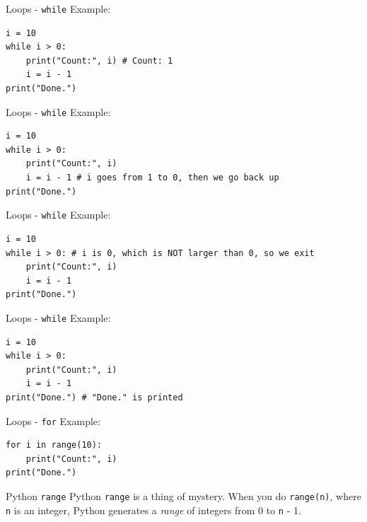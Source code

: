 \documentclass[dvipsnames, svgnames, x11names, handout]{beamer}
\begin{document}
\addtocounter{framenumber}{-1}

\begin{frame}[fragile]{Loops - \texttt{while}}
Example:
\begin{verbatim}
i = 10
while i > 0: 
    print("Count:", i) # Count: 1
    i = i - 1
print("Done.")
\end{verbatim}
\end{frame}

\addtocounter{framenumber}{-1}

\begin{frame}[fragile]{Loops - \texttt{while}}
Example:
\begin{verbatim}
i = 10
while i > 0: 
    print("Count:", i)
    i = i - 1 # i goes from 1 to 0, then we go back up
print("Done.")
\end{verbatim}
\end{frame}

\addtocounter{framenumber}{-1}

\begin{frame}[fragile]{Loops - \texttt{while}}
Example:
\begin{verbatim}
i = 10
while i > 0: # i is 0, which is NOT larger than 0, so we exit
    print("Count:", i)
    i = i - 1
print("Done.")
\end{verbatim}
\end{frame}

\addtocounter{framenumber}{-1}

\begin{frame}[fragile]{Loops - \texttt{while}}
Example:
\begin{verbatim}
i = 10
while i > 0:
    print("Count:", i)
    i = i - 1
print("Done.") # "Done." is printed
\end{verbatim}
\end{frame}

\begin{frame}[fragile]{Loops - \texttt{for}}
Example:
\begin{verbatim}
for i in range(10):
    print("Count:", i)
print("Done.")
\end{verbatim}
\begin{block}{Python \texttt{range}}
Python \texttt{range} is a thing of mystery. When you do \texttt{range(n)}, where \texttt{n} is an integer, Python generates a \textit{range} of integers from 0 to \texttt{n} - 1.
\end{block}
\end{frame}
\end{document}
